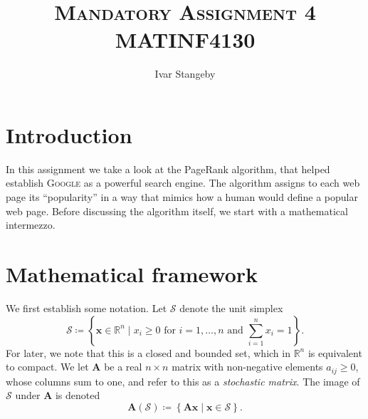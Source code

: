 \documentclass[12pt, oneside, article, a4paper]{memoir}
\title{ \textsc{Mandatory Assignment 4} \\
\textsc{MATINF4130}}
\author{Ivar Stangeby}
\newcommand{\mat}[1]{\bm{#1}}
\begin{document}
\maketitle

\chapter{Introduction}

In this assignment we take a look at the PageRank algorithm, that helped
establish \textsc{Google} as a powerful search engine.  The algorithm
assigns to each web page its ``popularity'' in a way that mimics how a
human would define a popular web page. Before discussing the algorithm
itself, we start with a mathematical intermezzo.

\chapter{Mathematical framework}

We first establish some notation. Let \( \mathcal{S} \) denote the unit
simplex
\begin{equation}
    \mathcal{S} \coloneqq \left\{ \mat{x} \in \mathbb{R}^n \mid x_i \geq
    0 \text{ for  } i = 1, \ldots, n \text{ and } \sum_{i=1}^n x_i =
1\right\}.
\end{equation}
For later, we note that this is a closed and bounded set, which in \(
\mathbb{R}^n\) is equivalent to compact. We let \( \mat{A} \) be a real
\( n \times n \) matrix with non-negative elements \( a_{ij} \geq 0 \),
whose columns sum to one, and refer to this as a \emph{stochastic
matrix}.  The image of \( \mathcal{S} \) under \( \mat{A} \) is denoted
\begin{equation}
    \mat{A}(\mathcal{S}) \coloneqq  \left\{ \mat{Ax} \mid \mat{x} \in
    \mathcal{S} \right\}.
\end{equation}
\end{document}
